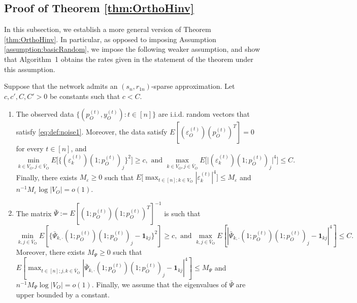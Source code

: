 \documentclass[opre,nonblindrev]{informs3} %
\def\Pk{\bar{\Psi}_{k,\cdot} }
\begin{document}
\begin{APPENDIX}{}
\subsection{Proof of Theorem \ref{thm:OrthoHinv}}
In this subsection, we establish a more general version of Theorem \ref{thm:OrthoHinv}.
In particular, as opposed to imposing Assumption \ref{assumption:basicRandom}, we impose the following weaker assumption, and show that Algorithm~1 obtains the rates given in the statement of the theorem under this assumption.


\begin{assumption}\label{Assumption:New}
	Suppose that the network admits an $(s_n,r_{1n})$-sparse approximation.
		Let $c,c',C,C'>0$ be  constants such that $c<C$.
		

\begin{enumerate}[label=\roman*.]
	\item 
	The observed data $\{ ({p}^{(t)}_O, {y}_O^{(t)}) : t\in [n]\}$ are i.i.d. random vectors
that satisfy \eqref{eq:def:noise1}.
Moreover, the data satisfy ${E}[({\varepsilon}^{(t)}_O) ({p}^{(t)}_O)^T ] = 0$ for every $t\in[n]$, and
	$$\min_{k\in V_O,j\in \bar V_O}E\bigg[  \{ 	(\varepsilon_{k}^{(t)}) (1;p_O^{(t)})_j \}^2\bigg] \geq c, \mbox{ and } \max_{k\in V_O,j\in \bar V_O} E\bigg[ 	{ \big|  (\varepsilon_{k}^{(t)}) (1;p_O^{(t)})_j }\big| ^4 	\bigg] \leq C.$$
Finally,
 there exists $M_\varepsilon\geq 0$ such that
 $E\big[ \max_{t\in [n]; k\in V_O} |
\varepsilon_{k}^{(t)} |^4\big] \leq M_\varepsilon$ and $n^{-1}M_\varepsilon \log |V_O| =o(1)$.	
	
\label{ass7.1}

\item 			The matrix $\bar \Psi:=E[(1;p_O^{(t)})(1;p_O^{(t)})^T]^{-1}$ is such that
$$\min_{k,j\in \bar V_O}E[ \{ \Pk(1;p_O^{(t)})(1;p_O^{(t)})_j - \mathbf{1}_{kj}\}^2] \geq c, \mbox{ and } \max_{k,j \in \bar V_O} E[ | \Pk(1;p_O^{(t)})(1;p_O^{(t)})_j - \mathbf{1}_{kj}|^4] \leq C.$$
  Moreover, there exists $M_\Psi\geq 0$ such that
$E[ \max_{t\in [n]; j,k\in \bar V_O} |  \Pk(1;p_O^{(t)})(1;p_O^{(t)})_j  - \mathbf{1}_{kj}|^4 ] \leq M_\Psi$  and $n^{-1}M_\Psi\log |V_O| =o(1)$.
{Finally, we assume that the eigenvalues of $\bar \Psi$ are upper bounded by a constant.}
	 
	   \label{ass7.2}
	

\end{enumerate}
\end{assumption}
\end{APPENDIX}
\end{document}
